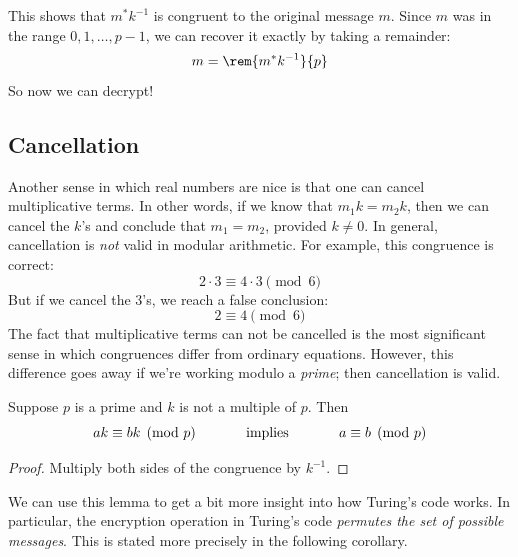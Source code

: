 This shows that $m^* k^{-1}$ is congruent to the original message $m$.
Since $m$ was in the range $0, 1, \dots, p - 1$, we can recover
it exactly by taking a remainder:
%
\[
m = \rem{m^* k^{-1}}{p}
\]
%
So now we can decrypt!

\subsection{Cancellation}

Another sense in which real numbers are nice is that one can cancel
multiplicative terms.  In other words, if we know that $m_1 k = m_2 k$,
then we can cancel the $k$'s and conclude that $m_1 = m_2$, provided $k
\neq 0$.  In general, cancellation is \textit{not} valid in modular
arithmetic.  For example, this congruence is correct:
%
\[
2 \cdot 3 \equiv 4 \cdot 3 \pmod{6}
\]
%
But if we cancel the 3's, we reach a false conclusion:
%
\[
2 \equiv 4 \pmod{6}
\]
%
The fact that multiplicative terms can not be cancelled is the most
significant sense in which congruences differ from ordinary equations.
However, this difference goes away if we're working modulo a
\textit{prime}; then cancellation is valid.

\begin{lemma}
\label{lem:cancel}
Suppose $p$ is a prime and $k$ is not a multiple of $p$.  Then
%
\[
ak \equiv bk \pmod{p}
\hspace{0.5in} \text{implies} \hspace{0.5in}
a \equiv b \pmod{p}
\]
\end{lemma}

\begin{proof}
Multiply both sides of the congruence by $k^{-1}$.
\end{proof}

We can use this lemma to get a bit more insight into how Turing's code
works.  In particular, the encryption operation in Turing's code
\textit{permutes the set of possible messages}.  This is stated more
precisely in the following corollary.


